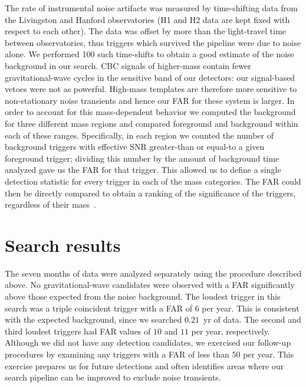 The rate of instrumental noise artifacts was measured by time-shifting data
from the Livingston and Hanford observatories (H1 and H2 data are kept fixed
with respect to each other). The data was offset by more than the light-travel
time between observatories, thus triggers which survived the pipeline were due
to noise alone. We performed 100 such time-shifts to obtain a good estimate of
the noise background in our search. \ac{CBC} signals of higher-mass contain
fewer gravitational-wave cycles in the sensitive band of our detectors: our
signal-based vetoes were not as powerful. High-mass templates are therefore
more sensitive to non-stationary noise transients and hence our \ac{FAR} for
these system is larger. In order to account for this mass-dependent behavior we
computed the background for three different mass regions and compared
foreground and background within each of these ranges. Specifically, in each
region we counted the number of background triggers with effective \ac{SNR}
greater-than or equal-to a given foreground trigger; dividing this number by
the amount of background time analyzed gave us the \ac{FAR} for that trigger.
This allowed us to define a single detection statistic for every trigger in
each of the mass categories.  The \ac{FAR} could then be directly compared to
obtain a ranking of the significance of the triggers, regardless of their
mass~\cite{Collaboration:2009tt}. 

\section{Search results}
\label{sec:results}

The seven months of data were analyzed separately using the procedure described
above. No gravitational-wave candidates were observed with a \ac{FAR}
significantly above those expected from the noise background.  The loudest
trigger in this search was a triple coincident trigger with a FAR of $6$ per
year. This is consistent with the expected background, since we searched
$0.21$~yr of data. The second and third loudest triggers had FAR values of $10$
and $11$ per year, respectively. Although we did not have any detection
candidates, we exercised our follow-up procedures by examining any triggers
with a \ac{FAR} of less than $50$ per year.  This exercise prepares us for
future detections and often identifies areas where our search pipeline can be
improved to exclude noise transients.

